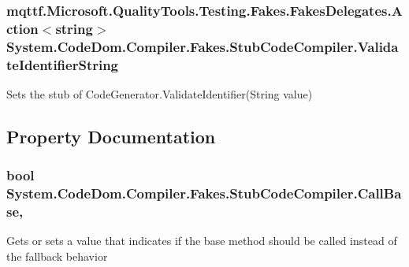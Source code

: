 \hypertarget{class_system_1_1_code_dom_1_1_compiler_1_1_fakes_1_1_stub_code_compiler_a1f36c54238591c165ce1eb61479c1a26}{
\subsubsection[{Validate\-Identifier\-String}]{\setlength{\rightskip}{0pt plus 5cm}mqttf.\-Microsoft.\-Quality\-Tools.\-Testing.\-Fakes.\-Fakes\-Delegates.\-Action$<$string$>$ System.\-Code\-Dom.\-Compiler.\-Fakes.\-Stub\-Code\-Compiler.\-Validate\-Identifier\-String}}\label{class_system_1_1_code_dom_1_1_compiler_1_1_fakes_1_1_stub_code_compiler_a1f36c54238591c165ce1eb61479c1a26}


Sets the stub of Code\-Generator.\-Validate\-Identifier(\-String value)



\subsection{Property Documentation}
\hypertarget{class_system_1_1_code_dom_1_1_compiler_1_1_fakes_1_1_stub_code_compiler_af8b8970f627fc578ce51a7b587e54176}{
\subsubsection[{Call\-Base}]{\setlength{\rightskip}{0pt plus 5cm}bool System.\-Code\-Dom.\-Compiler.\-Fakes.\-Stub\-Code\-Compiler.\-Call\-Base\hspace{0.3cm}{\ttfamily [get]}, {\ttfamily [set]}}}\label{class_system_1_1_code_dom_1_1_compiler_1_1_fakes_1_1_stub_code_compiler_af8b8970f627fc578ce51a7b587e54176}


Gets or sets a value that indicates if the base method should be called instead of the fallback behavior

